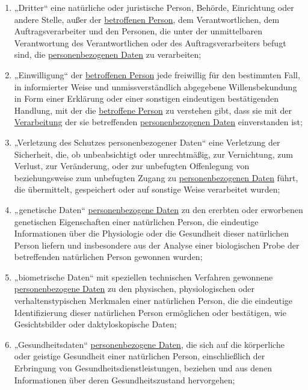 \begin{enumerate}
  \item „Dritter“ eine natürliche oder juristische Person, Behörde, Einrichtung oder andere Stelle, außer der
   \hyperref[itm:04-1]{betroffenen Person}, dem Verantwortlichen, dem Auftragsverarbeiter und den Personen, die unter der unmittelbaren
   Verantwortung des Verantwortlichen oder des Auftragsverarbeiters befugt sind, die \hyperref[itm:04-1]{personenbezogenen Daten} zu
   verarbeiten;
  \label{itm:04-10}

  \item „Einwilligung“ der \hyperref[itm:04-1]{betroffenen Person} jede freiwillig für den bestimmten Fall, in informierter Weise und
   unmissverständlich abgegebene Willensbekundung in Form einer Erklärung oder einer sonstigen eindeutigen
   bestätigenden Handlung, mit der die \hyperref[itm:04-1]{betroffene Person} zu verstehen gibt, dass sie mit der \hyperref[itm:04-2]{Verarbeitung} der sie
   betreffenden \hyperref[itm:04-1]{personenbezogenen Daten} einverstanden ist;
  \label{itm:04-11}

  \item „Verletzung des Schutzes personenbezogener Daten“ eine Verletzung der Sicherheit, die, ob unbeabsichtigt oder
   unrechtmäßig, zur Vernichtung, zum Verlust, zur Veränderung, oder zur unbefugten Offenlegung von beziehungsweise zum
   unbefugten Zugang zu \hyperref[itm:04-1]{personenbezogenen Daten} führt, die übermittelt, gespeichert oder auf sonstige Weise verarbeitet
   wurden;
  \label{itm:04-12}

  \item „genetische Daten“ \hyperref[itm:04-1]{personenbezogene Daten} zu den ererbten oder erworbenen genetischen Eigenschaften einer
   natürlichen Person, die eindeutige Informationen über die Physiologie oder die Gesundheit dieser natürlichen Person
   liefern und insbesondere aus der Analyse einer biologischen Probe der betreffenden natürlichen Person gewonnen
   wurden;
  \label{itm:04-13}

  \item „biometrische Daten“ mit speziellen technischen Verfahren gewonnene \hyperref[itm:04-1]{personenbezogene Daten} zu den physischen,
   physiologischen oder verhaltenstypischen Merkmalen einer natürlichen Person, die die eindeutige Identifizierung
   dieser natürlichen Person ermöglichen oder bestätigen, wie Gesichtsbilder oder daktyloskopische Daten;
  \label{itm:04-14}

  \item „Gesundheitsdaten“ \hyperref[itm:04-1]{personenbezogene Daten}, die sich auf die körperliche oder geistige Gesundheit einer
   natürlichen Person, einschließlich der Erbringung von Gesundheitsdienstleistungen, beziehen und aus denen
   Informationen über deren Gesundheitszustand hervorgehen;
  \label{itm:04-15}


\end{enumerate}
